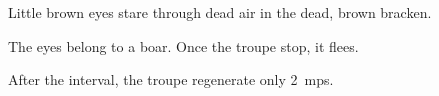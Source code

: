 \begin{boxtext}
  Little brown eyes stare through dead air in the dead, brown bracken.
\end{boxtext}

The eyes belong to a boar.
Once the troupe stop, it flees.

\boar

After the \gls{interval}, the troupe regenerate only 2~\glspl{mp}.
